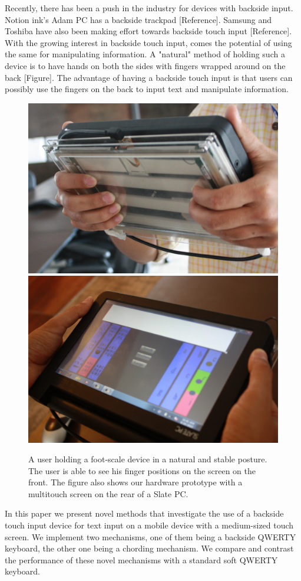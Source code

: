Recently, there has been a push in the industry for devices with
backside input. Notion ink's Adam PC has a backside trackpad
[Reference]. Samsung and Toshiba have also been making effort towards
backside touch input [Reference]. With the growing interest in
backside touch input, comes the potential of using the same for
manipulating information. A "natural" method of holding such a device
is to have hands on both the sides with fingers wrapped around on the
back [Figure]. The advantage of having a backside touch input is that
users can possibly use the fingers on the back to input text and
manipulate information.
\begin{figure}
    \includegraphics[scale=0.43]{Figures/natural1.pdf} 
     \includegraphics[scale=0.43]{Figures/natural2.pdf} 
  	\caption{A user holding a foot-scale device in a natural and stable posture. The user is able to see his finger positions on the screen on the front. The figure also shows our hardware prototype with a multitouch screen on the rear of a Slate PC.}
\end{figure}
In this paper we present novel methods that investigate the use of a
backside touch input device for text input on a mobile device with a medium-sized
touch screen. We implement two mechanisms, one of them being a backside
QWERTY keyboard, the other one being a chording mechanism. We compare
and contrast the performance of these novel mechanisms with a standard
soft QWERTY keyboard.

